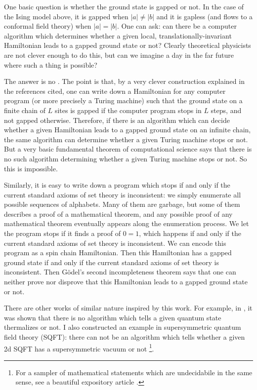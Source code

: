 \documentclass[12pt]{article}
\numberwithin{equation}{section}
\numberwithin{figure}{section}
\theoremstyle{remark}
\begin{document}
One basic question is whether the ground state is gapped or not. 
In the case of the Ising model above, it is gapped when $|a|\neq |b|$ and it is gapless (and flows to a conformal field theory) when $|a|=|b|$.
One can ask: can there be a computer algorithm
which determines whether a given local, translationally-invariant Hamiltonian leads to a gapped ground state or not?
Clearly theoretical physicists are not clever enough to do this,
but can we imagine a day in the far future where such a thing is possible?

The answer is no \cite{2dNature,2dLong,1d}.
The point is that, by a very clever construction explained in the references cited,
one can write down a Hamiltonian for any computer program (or more precisely a Turing machine)
such that the ground state on a finite chain of $L$ sites is gapped 
if the computer program stops in $L$ steps,
and not gapped otherwise.
Therefore, if there is an algorithm which can decide whether a given Hamiltonian leads to a gapped ground state on an infinite chain,
the same algorithm can determine whether a given Turing machine stops or not.
But a very basic fundamental theorem of computational science says that
there is no such algorithm determining whether a given Turing machine stops or not.
So this is impossible.

Similarly, it is easy to write down a program which stops if and only if the current standard axioms of set theory is inconsistent: 
we simply enumerate all possible sequences of alphabets.
Many of them are garbage, but some of them describes a proof of a mathematical theorem,
and any possible proof of any mathematical theorem eventually appears along the enumeration process.
We let the program stops if it finds a proof of $0=1$, which happens if and only if the current standard axioms of set theory is inconsistent. 
We can encode this program as a spin chain Hamiltonian.
Then this Hamiltonian has a gapped ground state if and only if the current standard axioms of set theory is inconsistent. 
Then G\"odel's second incompleteness theorem says that one can neither prove nor disprove that this Hamiltonian leads to a gapped ground state or not.

There are other works of similar nature inspired by this work.
For example, in \cite{thermalNature,thermalLong}, it was shown that 
there is no algorithm which tells a given quantum state thermalizes or not.
I also constructed an example in supersymmetric quantum field theory (SQFT):
there can not be an algorithm which tells whether a given 2d SQFT has a supersymmetric vacuum or not \cite{Tachikawa:2022vsh}\footnote{%
For a sampler of mathematical statements which are undecidabile in the same sense,
see a beautiful expository article \cite{Poonen}.
}.
\end{document}
